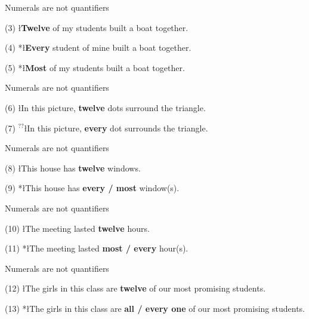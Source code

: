 \documentclass[pdf,12pt]{beamer}
\begin{document}
\begin{frame}{Numerals are not quantifiers}


(3) \l{{\bf Twelve} of my students built a boat together.}

(4) *\l{{\bf Every} student of mine built a boat together.}

(5) *\l{{\bf Most} of my students built a boat together.}

\end{frame}

\begin{frame}{Numerals are not quantifiers}

(6) \l{In this picture, {\bf twelve} dots surround the triangle.}

(7) $^{??}$\l{In this picture, {\bf every} dot surrounds the triangle.}

\end{frame}

\begin{frame}{Numerals are not quantifiers}

(8) \l{This house has {\bf twelve} windows.}

(9) *\l{This house has {\bf every / most} window(s).}

\end{frame}

\begin{frame}{Numerals are not quantifiers}

(10) \l{The meeting lasted {\bf twelve} hours.}

(11) *\l{The meeting lasted {\bf most / every} hour(s).}

\end{frame}

\begin{frame}{Numerals are not quantifiers}

(12) \l{The girls in this class are {\bf twelve} of our most promising students.}

(13) *\l{The girls in this class are {\bf all / every one} of our most promising students.}



\end{frame}
\end{document}
